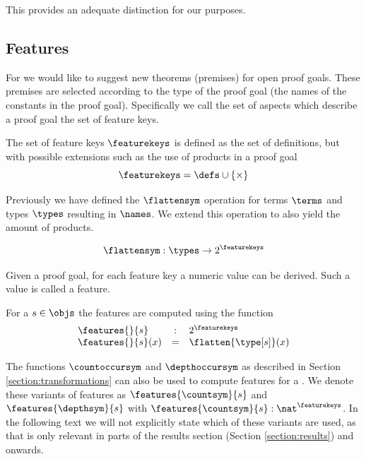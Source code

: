This provides an adequate distinction for our purposes.

\subsection{Features}
\label{section:feats}

For \premiseselection we would like to suggest new theorems (premises) for open proof goals.
These premises are selected according to the type of the proof goal (the names of the constants in the proof goal).
Specifically we call the set of aspects which describe a proof goal the set of feature keys.

\begin{definition}\label{def:featurekeys}
  The set of feature keys $\featurekeys$ is defined as the set of definitions, but with possible extensions such as the use of products in a proof goal
  \[ \featurekeys = \defs \cup \{ \times \} \]
\end{definition}

Previously we have defined the $\flattensym$ operation for terms $\terms$ and types $\types$ resulting in $\names$.
We extend this operation to also yield the amount of products.

\[ \flattensym : \types \rightarrow 2^{\featurekeys} \]

Given a proof goal, for each feature key a numeric value can be derived.
Such a value is called a feature.

\begin{definition}\label{def:features}
  For a \coqobj $s \in \objs$ the features are computed using the function
  $$
  \begin{array}{lcl}
    \features{}{s} & : & 2^\featurekeys \\
    \features{}{s}(x) & = & \flatten{\type[s]}(x)
  \end{array}
  $$
\end{definition}

The functions $\countoccursym$ and $\depthoccursym$ as described in Section \ref{section:transformations} can also be used to compute features for a \coqobj.
We denote these variants of features as $\features{\countsym}{s}$ and $\features{\depthsym}{s}$ with $\features{\countsym}{s} : \nat^\featurekeys$.
In the following text we will not explicitly state which of these variants are used,
as that is only relevant in parts of the results section (Section \ref{section:results}) and onwards.

